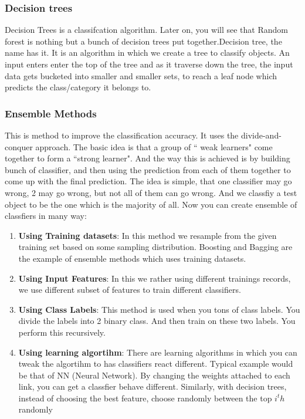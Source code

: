 \documentclass[journal]{IEEEtran}
\begin{document}
\subsubsection{Decision trees}
Decision Trees is a classifcation algorithm. Later on, you will see that Random forest is nothing but a bunch of decision trees put together.Decision tree, the name has it. It is an algorithm in which we create a tree to classify objects. An input enters enter the top of the tree and as it traverse down the tree, the input data gets bucketed into smaller and smaller sets, to reach a leaf node which predicts the class/category it belongs to.

\subsubsection{Ensemble Methods}
This is method to improve the classification accuracy. It uses the divide-and-conquer approach.  The basic idea is that a group of ``	weak learners" come together to form a ``strong learner". And the way this is achieved is by building bunch of classifier, and then using the prediction from each of them together to come up with the final prediction. The idea is simple, that one classifier may go wrong, 2 may go wrong, but not all of them can go wrong. And we classfiy a test object to be the one which is the majority of all. Now you can create ensemble of classfiers in many way:
\begin{enumerate}
	\item \textbf{Using Training datasets}: In this method we resample from the given training set based on some sampling distribution. Boosting and Bagging are the example of ensemble methods which uses training datasets.
	\item \textbf{Using Input Features}: In this we rather using  different trainings records, we use different subset of features to train different classifiers.
	\item \textbf{Using Class Labels}: This method is used when you tons of class labels. You divide the labels into 2 binary class. And then train on these two labels. You perform this recursively.
	\item \textbf{Using learning algortihm}: There are learning algorithms in which you can tweak the algortihm to has classifiers react different. Typical example would be that of NN (Neural Network). By changing the weights attached to each link, you can get a classfier behave different. Similarly, with decision trees, instead of choosing the best feature, choose randomly between the top $i^th$ randomly
\end{enumerate}
\end{document}
